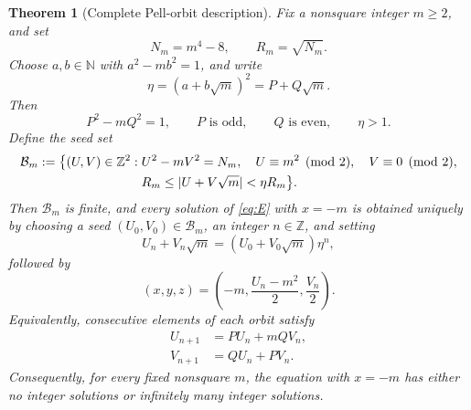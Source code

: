 \documentclass[11pt,a4paper]{amsart}
\numberwithin{equation}{section}
\newtheorem{theorem}{Theorem}[section]
\theoremstyle{definition}
\newcommand{\Z}{\mathbb Z}
\newcommand{\N}{\mathbb N}
\begin{document}
\begin{theorem}[Complete Pell-orbit description]\label{thm:pellorbits}
Fix a nonsquare integer \(m\ge2\), and set
\begin{equation}
 N_m=m^4-8,
 \qquad R_m=\sqrt{N_m}.
 \label{eq:NmRm}
\end{equation}
Choose \(a,b\in\N\) with \(a^2-mb^2=1\), and write
\begin{equation}
 \eta=(a+b\sqrt m)^2=P+Q\sqrt m.
 \label{eq:etadef}
\end{equation}
Then
\begin{equation}
 P^2-mQ^2=1,
 \qquad P\text{ is odd},
 \qquad Q\text{ is even},
 \qquad \eta>1.
 \label{eq:etaProperties}
\end{equation}
Define the seed set
\begin{align}
 \mathcal B_m:=\bigl\{(U,V)\in\Z^2:\;&
 U^2-mV^2=N_m,\quad
 U\equiv m^2\pmod2,\quad V\equiv0\pmod2,\notag\\
 &R_m\le |U+V\sqrt m|<\eta R_m\bigr\}.
 \label{eq:seedset}
\end{align}
Then \(\mathcal B_m\) is finite, and every solution of \eqref{eq:E}
with \(x=-m\) is obtained uniquely by choosing a seed
\((U_0,V_0)\in\mathcal B_m\), an integer \(n\in\Z\), and setting
\begin{equation}
 U_n+V_n\sqrt m=(U_0+V_0\sqrt m)\eta^n,
 \label{eq:pellorbit}
\end{equation}
followed by
\begin{equation}
 (x,y,z)=\left(-m,\frac{U_n-m^2}{2},\frac{V_n}{2}\right).
 \label{eq:pellback}
\end{equation}
Equivalently, consecutive elements of each orbit satisfy
\begin{equation}
 \begin{aligned}
 U_{n+1}&=PU_n+mQV_n,\\
 V_{n+1}&=QU_n+PV_n.
 \end{aligned}
 \label{eq:pellrecurrence}
\end{equation}
Consequently, for every fixed nonsquare \(m\), the equation with
\(x=-m\) has either no integer solutions or infinitely many integer
solutions.
\end{theorem}
\end{document}
